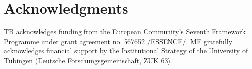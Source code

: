 \documentclass[10pt,a4paper]{article}
\newcommand{\tb}[1]{\textcolor[rgb]{.8,.33,.0}{[TB: #1]}}%
\begin{document}
\section{Acknowledgments}
TB   acknowledges   funding   from   the   European   Community's Seventh Framework Programme under grant agreement no.  567652 /ESSENCE/.  
MF gratefully acknowledges financial support by the Institutional Strategy of the University
of T\"{u}bingen (Deutsche Forschungsgemeinschaft, ZUK 63). 






\setlength{\bibleftmargin}{.125in}
\setlength{\bibindent}{-\bibleftmargin}


\end{document}
